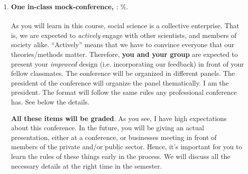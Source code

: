 \documentclass[letterpaper]{article}
\renewenvironment{itemize}{
  \begin{list}{}{
    \setlength{\leftmargin}{1.5em}
  }
}{
  \end{list}
}
\begin{document}
\begin{enumerate}
	\item {\bf One in-class mock-conference, \underline{{\unskip}}}: {\unskip}\%. 
	\\
	\\
	As you will learn in this course, social science is a collective enterprise. That is, we are expected to \emph{actively} engage with other scientists, and members of society alike. ``Actively'' means that we have to convince everyone that our theories/methods matter. Therefore, {\bf you and your group} are expected to present your \emph{improved} design (i.e. incorporating our feedback) in front of your fellow classmates. The conference will be organized in different panels. The president of the conference will organize the panel thematically. I am the president. The format will follow the same rules any professional conference has. See below the details.
	

{\bf All these items will be graded}. As you see, I have high expectations about this conference. In the future, you will be giving an actual presentation, either at a conference, or businesses meeting in front of members of the private and/or public sector. Hence, it's important for you to learn the rules of these things early in the process. We will discuss all the necessary details at the right time in the semester.



\end{enumerate}
\end{document}
